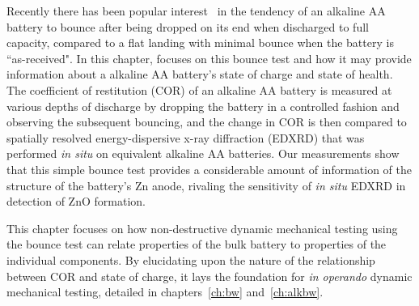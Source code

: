Recently there has been popular interest~\cite{youtube} in the tendency of an alkaline AA battery to bounce after being dropped on its end when discharged to full capacity, compared to a flat landing with minimal bounce when the battery is ``as-received". In this chapter, focuses on this bounce test and how it may provide information about a alkaline AA battery's state of charge and state of health. The coefficient of restitution (COR) of an alkaline AA battery is measured at various depths of discharge by dropping the battery in a controlled fashion and observing the subsequent bouncing, and the change in COR is then compared to spatially resolved energy-dispersive x-ray diffraction (EDXRD) that was performed \textit{in situ} on equivalent alkaline AA batteries. Our measurements show that this simple bounce test provides a considerable amount of information of the structure of the battery's Zn anode, rivaling the sensitivity of \textit{in situ} EDXRD in detection of ZnO formation. 

This chapter focuses on how non-destructive dynamic mechanical testing using the bounce test can relate properties of the bulk battery to properties of the individual components. By elucidating upon the nature of the relationship between COR and state of charge, it lays the foundation for \textit{in operando} dynamic mechanical testing, detailed in chapters~\ref{ch:bw} and~\ref{ch:alkbw}.
